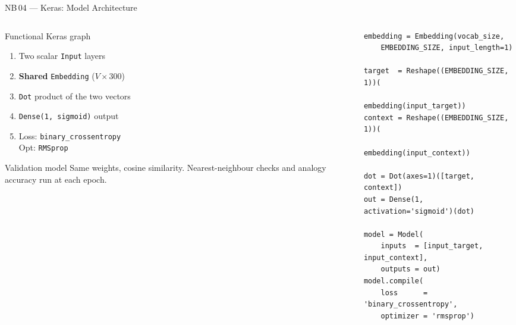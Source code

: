 \documentclass[11pt,aspectratio=169,professionalfonts]{beamer}
\begin{document}
\begin{frame}[fragile]{NB\,04 — Keras: Model Architecture}

  \begin{columns}[T]
    \begin{column}{0.44\textwidth}
      \begin{block}{Functional Keras graph}
        \begin{enumerate}\small
          \item Two scalar \texttt{Input} layers
          \item \textbf{Shared} \texttt{Embedding}
                ($V \times 300$)
          \item \texttt{Dot} product of the two vectors
          \item \texttt{Dense(1, sigmoid)} output
          \item Loss: \texttt{binary\_crossentropy}\\
                Opt: \texttt{RMSprop}
        \end{enumerate}
      \end{block}
      \vspace{0.4em}
      \begin{alertblock}{\small Validation model}
        \small Same weights, cosine similarity.
        Nearest-neighbour checks and analogy
        accuracy run at each epoch.
      \end{alertblock}
    \end{column}
    \begin{column}{0.50\textwidth}
\scriptsize
\begin{lstlisting}
embedding = Embedding(vocab_size,
    EMBEDDING_SIZE, input_length=1)

target  = Reshape((EMBEDDING_SIZE, 1))(
              embedding(input_target))
context = Reshape((EMBEDDING_SIZE, 1))(
              embedding(input_context))

dot = Dot(axes=1)([target, context])
out = Dense(1, activation='sigmoid')(dot)

model = Model(
    inputs  = [input_target, input_context],
    outputs = out)
model.compile(
    loss      = 'binary_crossentropy',
    optimizer = 'rmsprop')
\end{lstlisting}
    \end{column}
  \end{columns}

\end{frame}
%
%
\end{document}

